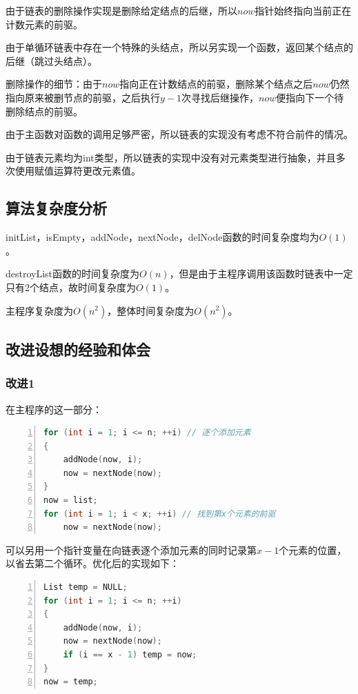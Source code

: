 \documentclass{article}
\begin{document}
由于链表的删除操作实现是删除给定结点的后继，所以$now$指针始终指向当前正在计数元素的前驱。

由于单循环链表中存在一个特殊的头结点，所以另实现一个函数，返回某个结点的后继（跳过头结点）。

删除操作的细节：由于$now$指向正在计数结点的前驱，删除某个结点之后$now$仍然指向原来被删节点的前驱，之后执行$y-1$次寻找后继操作，$now$便指向下一个待删除结点的前驱。

由于主函数对函数的调用足够严密，所以链表的实现没有考虑不符合前件的情况。

由于链表元素均为int类型，所以链表的实现中没有对元素类型进行抽象，并且多次使用赋值运算符更改元素值。

\subsection{算法复杂度分析}

initList，isEmpty，addNode，nextNode，delNode函数的时间复杂度均为$O(1)$。

destroyList函数的时间复杂度为$O(n)$，但是由于主程序调用该函数时链表中一定只有2个结点，故时间复杂度为$O(1)$。

主程序复杂度为$O(n^2)$，整体时间复杂度为$O(n^2)$。

\subsection{改进设想的经验和体会}

\subsubsection{改进1}

在主程序的这一部分：

\begin{lstlisting}[language={C},
    numbers=left,
    numberstyle=\tiny\consolas,
    basicstyle=\small\consolas]
for (int i = 1; i <= n; ++i) // 逐个添加元素
{
    addNode(now, i);
    now = nextNode(now);
}
now = list;
for (int i = 1; i < x; ++i) // 找到第x个元素的前驱
    now = nextNode(now);
\end{lstlisting}

可以另用一个指针变量在向链表逐个添加元素的同时记录第$x-1$个元素的位置，以省去第二个循环。优化后的实现如下：

\begin{lstlisting}[language={C},
    numbers=left,
    numberstyle=\tiny\consolas,
    basicstyle=\small\consolas]
List temp = NULL;
for (int i = 1; i <= n; ++i)
{
    addNode(now, i);
    now = nextNode(now);
    if (i == x - 1) temp = now;
}
now = temp;
\end{lstlisting}
\end{document}
